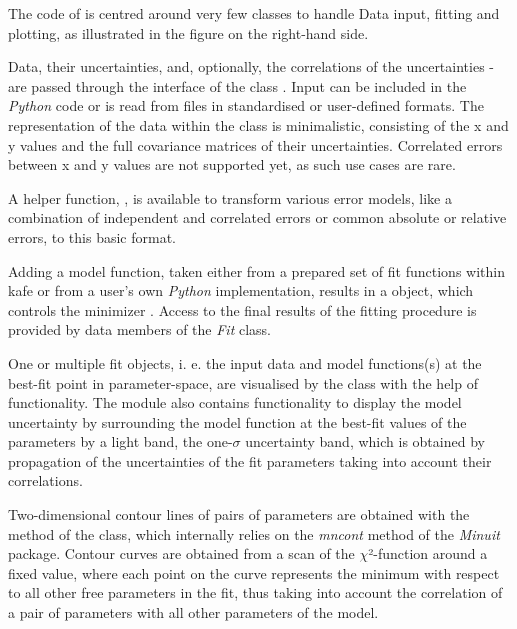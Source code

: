 \documentclass[a4paper,10pt,english]{sphinxmanual}
\begin{document}
The code of  is centred around very few classes to handle Data input,
fitting and plotting, as illustrated in the figure on the right-hand side.

Data, their uncertainties, and, optionally, the correlations of the
uncertainties - are passed through the interface of the  class
{\hyperref[index:kafe.dataset.Dataset]{}}. Input can be included in the \emph{Python} code
or is read from files in standardised or user-defined formats. The representation
of the data within the {\hyperref[index:kafe.dataset.Dataset]{}} class is minimalistic,
consisting of the x and y values and the full covariance matrices of their
uncertainties. Correlated errors between x and y values are not
supported yet, as such use cases are rare.

A helper function, {\hyperref[index:kafe.dataset.build_dataset]{}}, is available
to transform various error models, like a combination of independent
and correlated errors or common absolute or relative errors, to this
basic format.

Adding a model function, taken either from a prepared set of fit
functions within kafe or from a user's own \emph{Python} implementation,
results in a {\hyperref[index:kafe.fit.Fit]{}} object, which controls the
minimizer {\hyperref[index:kafe.minuit.Minuit]{}}. Access to the final
results of the fitting procedure is provided by data members of
the \emph{Fit} class.

One or multiple fit objects, i. e. the input data and model
functions(s) at the best-fit point in parameter-space, are
visualised by the class {\hyperref[index:kafe.plot.Plot]{}} with the help
of  functionality. The {\hyperref[index:module-plot]{}} module
also contains functionality to display the model uncertainty by
surrounding the model function at the best-fit values of the parameters
by a light band, the one-\(\sigma\) uncertainty band, which is obtained by
propagation of the uncertainties of the fit parameters taking
into account their correlations.

Two-dimensional contour lines of pairs of parameters
are obtained with the method 
of the  class, which internally relies on the
\emph{mncont} method of the \emph{Minuit} package. Contour curves are
obtained from a scan of the \(\chi\)²-function around a fixed value,
where each point on the curve represents the minimum with
respect to all other free parameters in the fit, thus taking
into account the correlation of a pair of parameters with all
other parameters of the model.
\end{document}
